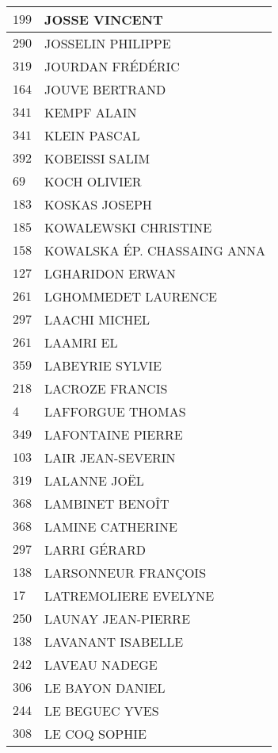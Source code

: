 \begin{xltabular}{\linewidth}{|l|X|}
    \hline
    $199$ & JOSSE VINCENT \\
    \hline
    $290$ & JOSSELIN PHILIPPE \\
    \hline
    $319$ & JOURDAN FRÉDÉRIC \\
    \hline
    $164$ & JOUVE BERTRAND \\
    \hline
    $341$ & KEMPF ALAIN \\
    \hline
    $341$ & KLEIN PASCAL \\
    \hline
    $392$ & KOBEISSI SALIM \\
    \hline
    $69$ & KOCH OLIVIER \\
    \hline
    $183$ & KOSKAS JOSEPH \\
    \hline
    $185$ & KOWALEWSKI CHRISTINE \\
    \hline
    $158$ & KOWALSKA ÉP. CHASSAING ANNA \\
    \hline
    $127$ & LGHARIDON ERWAN \\
    \hline
    $261$ & LGHOMMEDET LAURENCE \\
    \hline
    $297$ & LAACHI MICHEL \\
    \hline
    $261$ & LAAMRI EL \\
    \hline
    $359$ & LABEYRIE SYLVIE \\
    \hline
    $218$ & LACROZE FRANCIS \\
    \hline
    $4$ & LAFFORGUE THOMAS \\
    \hline
    $349$ & LAFONTAINE PIERRE \\
    \hline
    $103$ & LAIR JEAN-SEVERIN \\
    \hline
    $319$ & LALANNE JOËL \\
    \hline
    $368$ & LAMBINET BENOÎT \\
    \hline
    $368$ & LAMINE CATHERINE \\
    \hline
    $297$ & LARRI GÉRARD \\
    \hline
    $138$ & LARSONNEUR FRANÇOIS \\
    \hline
    $17$ & LATREMOLIERE EVELYNE \\
    \hline
    $250$ & LAUNAY JEAN-PIERRE \\
    \hline
    $138$ & LAVANANT ISABELLE \\
    \hline
    $242$ & LAVEAU NADEGE \\
    \hline
    $306$ & LE BAYON DANIEL \\
    \hline
    $244$ & LE BEGUEC YVES \\
    \hline
    $308$ & LE COQ SOPHIE \\

\end{xltabular}
